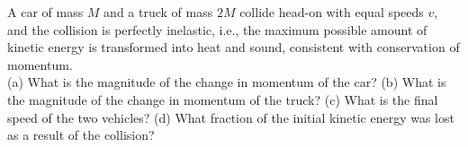 A car of mass $M$ and a truck of mass $2M$ collide head-on with
equal speeds $v$, and the collision is perfectly inelastic, i.e.,
the maximum possible amount of kinetic energy is transformed into
heat and sound, consistent with conservation of momentum.\\
%
(a) What is the magnitude of the change in momentum of the
car?\answercheck\hwendpart
%
(b) What is the magnitude of the change in momentum of the
truck?\answercheck\hwendpart
%
(c) What is the final speed of the two vehicles?\answercheck\hwendpart
%
(d) What fraction of the initial kinetic energy was lost as a result
of the collision?\answercheck
